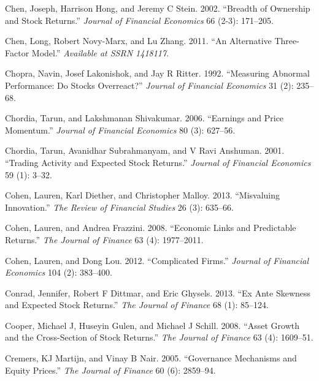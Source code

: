\documentclass[
  letterpaper,
  DIV=11,
  numbers=noendperiod]{scrreprt}
\newlength{\cslhangindent}
\newlength{\cslentryspacingunit} %
\newenvironment{CSLReferences}[2] %
 {%
  \setlength{\parindent}{0pt}
  \ifodd #1
  \let\oldpar\par
  \def\par{\hangindent=\cslhangindent\oldpar}
  \fi
  \setlength{\parskip}{#2\cslentryspacingunit}
 }%
 {}
\begin{document}
\begin{CSLReferences}{1}{0}
\leavevmode{}%
Chen, Joseph, Harrison Hong, and Jeremy C Stein. 2002. {``Breadth of
Ownership and Stock Returns.''} \emph{Journal of Financial Economics} 66
(2-3): 171--205.

\leavevmode{}%
Chen, Long, Robert Novy-Marx, and Lu Zhang. 2011. {``An Alternative
Three-Factor Model.''} \emph{Available at SSRN 1418117}.

\leavevmode{}%
Chopra, Navin, Josef Lakonishok, and Jay R Ritter. 1992. {``Measuring
Abnormal Performance: Do Stocks Overreact?''} \emph{Journal of Financial
Economics} 31 (2): 235--68.

\leavevmode{}%
Chordia, Tarun, and Lakshmanan Shivakumar. 2006. {``Earnings and Price
Momentum.''} \emph{Journal of Financial Economics} 80 (3): 627--56.

\leavevmode{}%
Chordia, Tarun, Avanidhar Subrahmanyam, and V Ravi Anshuman. 2001.
{``Trading Activity and Expected Stock Returns.''} \emph{Journal of
Financial Economics} 59 (1): 3--32.

\leavevmode{}%
Cohen, Lauren, Karl Diether, and Christopher Malloy. 2013. {``Misvaluing
Innovation.''} \emph{The Review of Financial Studies} 26 (3): 635--66.

\leavevmode{}%
Cohen, Lauren, and Andrea Frazzini. 2008. {``Economic Links and
Predictable Returns.''} \emph{The Journal of Finance} 63 (4):
1977--2011.

\leavevmode{}%
Cohen, Lauren, and Dong Lou. 2012. {``Complicated Firms.''}
\emph{Journal of Financial Economics} 104 (2): 383--400.

\leavevmode{}%
Conrad, Jennifer, Robert F Dittmar, and Eric Ghysels. 2013. {``Ex Ante
Skewness and Expected Stock Returns.''} \emph{The Journal of Finance} 68
(1): 85--124.

\leavevmode{}%
Cooper, Michael J, Huseyin Gulen, and Michael J Schill. 2008. {``Asset
Growth and the Cross-Section of Stock Returns.''} \emph{The Journal of
Finance} 63 (4): 1609--51.

\leavevmode{}%
Cremers, KJ Martijn, and Vinay B Nair. 2005. {``Governance Mechanisms
and Equity Prices.''} \emph{The Journal of Finance} 60 (6): 2859--94.


\end{CSLReferences}
\end{document}
